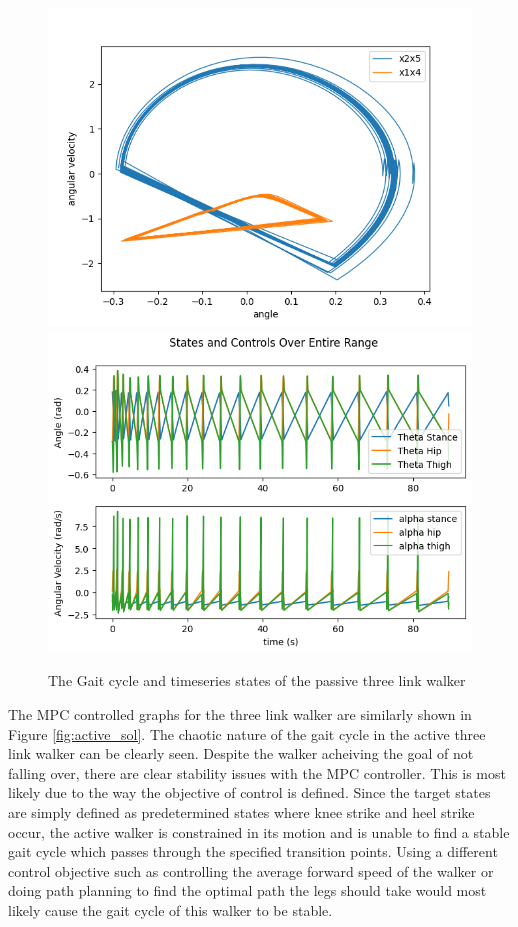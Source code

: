 \documentclass{./springer/svjour3}
\begin{document}
\begin{figure}[!h]
  \centering
  \includegraphics[width=.4\linewidth]{./figures/gait_passive.png} %
  \includegraphics[width=.4\linewidth]{./figures/ts_passive.png}
  \caption{The Gait cycle and timeseries states of the passive three link walker}
  \label{fig:passive_sol}
  \end{figure}

The MPC controlled graphs for the three link walker are similarly shown in Figure \ref{fig:active_sol}. The chaotic nature of the gait cycle in the active three link walker 
can be clearly seen. Despite the walker acheiving the goal of not falling over, there are clear stability issues with the MPC controller. This is most likely due 
to the way the objective of control is defined. Since the target states are simply defined as predetermined states where knee strike and heel strike occur, the 
active walker is constrained in its motion and is unable to find a stable gait cycle which passes through the specified transition points. 
Using a different control objective such as controlling the average forward speed of the walker or doing path planning to find the optimal path the legs should take 
would most likely cause the gait cycle of this walker to be stable.
\end{document}
